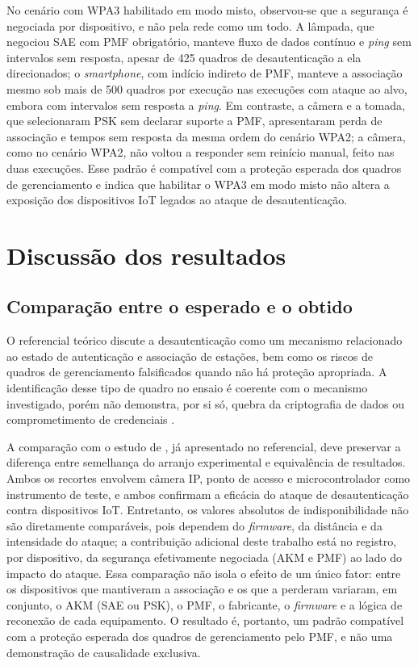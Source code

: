 No cenário com WPA3 habilitado em modo misto, observou-se que a segurança é negociada por dispositivo, e não pela rede como um todo. A lâmpada, que negociou SAE com PMF obrigatório, manteve fluxo de dados contínuo e \textit{ping} sem intervalos sem resposta, apesar de 425 quadros de desautenticação a ela direcionados; o \textit{smartphone}, com indício indireto de PMF, manteve a associação mesmo sob mais de 500 quadros por execução nas execuções com ataque ao alvo, embora com intervalos sem resposta a \textit{ping}. Em contraste, a câmera e a tomada, que selecionaram PSK sem declarar suporte a PMF, apresentaram perda de associação e tempos sem resposta da mesma ordem do cenário WPA2; a câmera, como no cenário WPA2, não voltou a responder sem reinício manual, feito nas duas execuções. Esse padrão é compatível com a proteção esperada dos quadros de gerenciamento e indica que habilitar o WPA3 em modo misto não altera a exposição dos dispositivos IoT legados ao ataque de desautenticação.

\section{Discussão dos resultados}
\label{sec:discussao}

\subsection{Comparação entre o esperado e o obtido}

O referencial teórico discute a desautenticação como um mecanismo relacionado ao estado de autenticação e associação de estações, bem como os riscos de quadros de gerenciamento falsificados quando não há proteção apropriada. A identificação desse tipo de quadro no ensaio é coerente com o mecanismo investigado, porém não demonstra, por si só, quebra da criptografia de dados ou comprometimento de credenciais \cite{KohliosHayajneh2018}.



A comparação com o estudo de , já apresentado no referencial, deve preservar a diferença entre semelhança do arranjo experimental e equivalência de resultados. Ambos os recortes envolvem câmera IP, ponto de acesso e microcontrolador como instrumento de teste, e ambos confirmam a eficácia do ataque de desautenticação contra dispositivos IoT. Entretanto, os valores absolutos de indisponibilidade não são diretamente comparáveis, pois dependem do \textit{firmware}, da distância e da intensidade do ataque; a contribuição adicional deste trabalho está no registro, por dispositivo, da segurança efetivamente negociada (AKM e PMF) ao lado do impacto do ataque. Essa comparação não isola o efeito de um único fator: entre os dispositivos que mantiveram a associação e os que a perderam variaram, em conjunto, o AKM (SAE ou PSK), o PMF, o fabricante, o \textit{firmware} e a lógica de reconexão de cada equipamento. O resultado é, portanto, um padrão compatível com a proteção esperada dos quadros de gerenciamento pelo PMF, e não uma demonstração de causalidade exclusiva.



